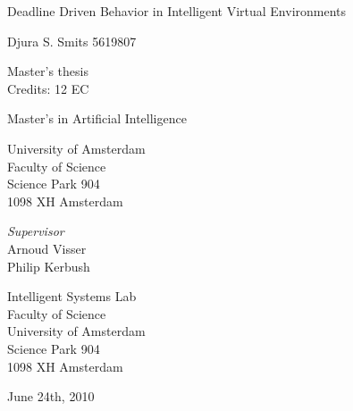 \documentclass[11pt]{book}
\begin{document}
\begin{center}

\vspace{2.5cm}

\begin{Huge}
Deadline Driven Behavior in Intelligent Virtual Environments
\end{Huge}
\vspace{1.5cm}

Djura S. Smits
5619807

\vspace{1.5cm}

Master's thesis\\
Credits: 12 EC

\vspace{0.5cm}

Master's in Artificial Intelligence

\vspace{0.25cm}

University of Amsterdam\\
Faculty of Science\\
Science Park 904\\
1098 XH Amsterdam

\vspace{4cm}

\emph{Supervisor}\\
Arnoud Visser\\
Philip Kerbush

\vspace{0.25cm}

Intelligent Systems Lab\\
Faculty of Science\\
University of Amsterdam\\
Science Park 904\\
1098 XH  Amsterdam

\vspace{1.5cm}

June 24th, 2010

\end{center}
\newpage
\end{document}
